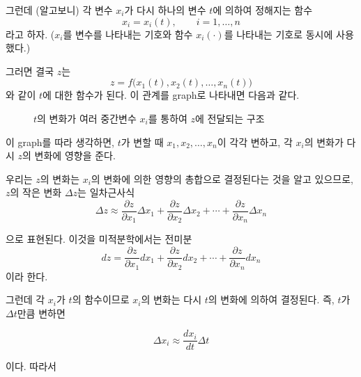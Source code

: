 \documentclass[11pt,a4paper]{article}
\begin{document}
그런데 (알고보니) 각 변수 $x_i$가 다시 하나의 변수 $t$에 의하여 정해지는 함수
\[
x_i=x_i(t),
\qquad i=1,\ldots,n
\]
라고 하자. ($x_i$를 변수를 나타내는 기호와 함수 $x_i(\cdot)$를 나타내는 기호로 동시에 사용했다.)

그러면 결국 $z$는
\[
z
=
f\bigl(
x_1(t),x_2(t),\ldots,x_n(t)
\bigr)
\]
와 같이 $t$에 대한 함수가 된다. 이 관계를 graph로 나타내면 다음과 같다.

\begin{figure}[ht]
\centering
{}
\caption{$t$의 변화가 여러 중간변수 $x_i$를 통하여 $z$에 전달되는 구조}
\end{figure}

이 graph를 따라 생각하면,
$t$가 변할 때 $x_1,x_2,\ldots,x_n$이 각각 변하고,
각 $x_i$의 변화가 다시 $z$의 변화에 영향을 준다.

우리는 $z$의 변화는 $x_i$의 변화에 의한 영향의 총합으로 결정된다는 것을 알고 있으므로, $z$의 작은 변화 $\Delta z$는 일차근사식
\[
\Delta z
\approx
\frac{\partial z}{\partial x_1}\Delta x_1
+
\frac{\partial z}{\partial x_2}\Delta x_2
+\cdots+
\frac{\partial z}{\partial x_n}\Delta x_n
\]

으로 표현된다. 이것을 미적분학에서는 전미분 
\[
dz
= \frac{\partial z}{\partial x_1}d x_1
+
\frac{\partial z}{\partial x_2}d x_2
+\cdots+
\frac{\partial z}{\partial x_n}d x_n
\]
이라 한다.

그런데 각 $x_i$가 $t$의 함수이므로 $x_i$의 변화는 다시 $t$의 변화에 의하여 결정된다. 즉, $t$가 $\Delta t$만큼 변하면

\[
\Delta x_i
\approx
\frac{dx_i}{dt}\Delta t
\]

이다. 따라서
\end{document}
